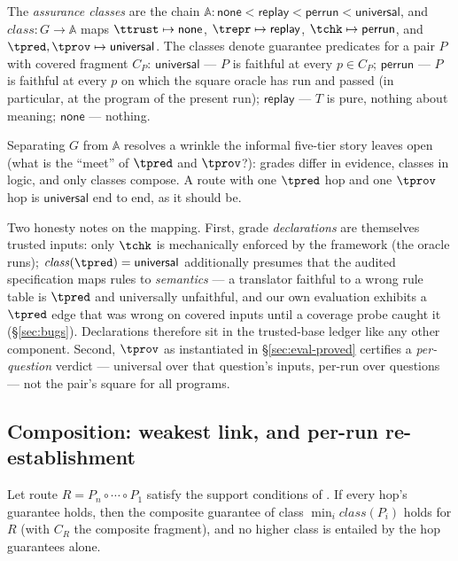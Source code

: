 \begin{definition}
\label{def:class}
The \emph{assurance classes} are the chain
$\mathbb{A} : \mathsf{none} < \mathsf{replay} < \mathsf{perrun} <
\mathsf{universal}$, and
$\mathit{class} : G \to \mathbb{A}$ maps
$\ttrust \mapsto \mathsf{none}$,
$\trepr \mapsto \mathsf{replay}$,
$\tchk \mapsto \mathsf{perrun}$, and
$\tpred, \tprov \mapsto \mathsf{universal}$.
The classes denote guarantee predicates for a pair $P$ with covered
fragment $C_P$:
$\mathsf{universal}$ --- $P$ is faithful at every $p \in C_P$;
$\mathsf{perrun}$ --- $P$ is faithful at every $p$ on which the square
oracle has run and passed (in particular, at the program of the present
run);
$\mathsf{replay}$ --- $T$ is pure, nothing about meaning;
$\mathsf{none}$ --- nothing.
\end{definition}

Separating $G$ from $\mathbb{A}$ resolves a wrinkle the informal
five-tier story leaves open (what is the ``meet'' of $\tpred$ and
$\tprov$?): grades differ in evidence, classes in logic, and only classes
compose. A route with one $\tpred$ hop and one $\tprov$ hop is
$\mathsf{universal}$ end to end, as it should be.

Two honesty notes on the mapping. First, grade \emph{declarations} are
themselves trusted inputs: only $\tchk$ is mechanically enforced by the
framework (the oracle runs); $\mathit{class}(\tpred) = \mathsf{universal}$
additionally presumes that the audited specification maps rules to
\emph{semantics} --- a translator faithful to a wrong rule table is
$\tpred$ and universally unfaithful, and our own evaluation exhibits a
$\tpred$ edge that was wrong on covered inputs until a coverage probe
caught it (\S\ref{sec:bugs}). Declarations therefore sit in the
trusted-base ledger like any other component. Second, $\tprov$ as
instantiated in \S\ref{sec:eval-proved} certifies a \emph{per-question}
verdict --- universal over that question's inputs, per-run over
questions --- not the pair's square for all programs.

\subsection{Composition: weakest link, and per-run re-establishment}
\label{sec:composition}

\begin{proposition}
\label{prop:weakestlink}
Let route $R = P_n \circ \cdots \circ P_1$ satisfy the support conditions
of . If every hop's guarantee holds, then the composite
guarantee of class $\min_i \mathit{class}(P_i)$ holds for $R$ (with
$C_R$ the composite fragment), and no higher class is entailed by the
hop guarantees alone.
\end{proposition}

